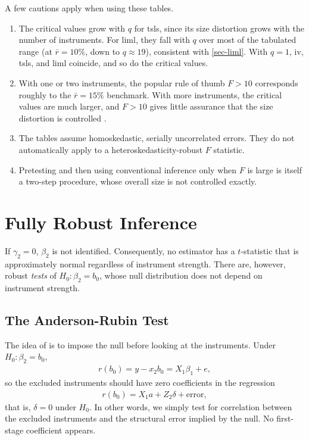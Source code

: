 \documentclass[a4paper,12pt]{article}
\begin{document}
\begin{remark}[Caveats]
	A few cautions apply when using these tables.
	\begin{enumerate}
		\item The critical values grow with $q$ for \gls{tsls}, since its size distortion grows with the number of instruments.
		For \gls{liml}, they fall with $q$ over most of the tabulated range (at $\bar r=10\%$, down to $q\approx19$),
		consistent with \autoref{sec-liml}.
		With $q=1$, \gls{iv}, \gls{tsls}, and \gls{liml} coincide, and so do the critical values.
		\item With one or two instruments, the popular rule of thumb $F>10$ \parencite{staiger-stock-1997}
		corresponds roughly to the $\bar r=15\%$ benchmark.
		With more instruments, the critical values are much larger, and $F>10$ gives little assurance that the size distortion is controlled \parencite{stock-yogo-2005}.
		\item The tables assume homoskedastic, serially uncorrelated errors.
		They do not automatically apply to a heteroskedasticity-robust $F$ statistic.
		\item Pretesting and then using conventional inference only when $F$ is large is itself a two-step procedure,
		whose overall size is not controlled exactly.
	\end{enumerate}
\end{remark}

\section{Fully Robust Inference}\label{sec-ar}

If $\gamma_2=0$, $\beta_2$ is not identified.
Consequently, no estimator has a $t$-statistic that is approximately normal regardless of instrument strength.
There are, however, robust \emph{tests} of $H_0:\beta_2=b_0$,
whose null distribution does not depend on instrument strength.

\subsection{The Anderson-Rubin Test}

The idea of \textcite{anderson-rubin-1949} is to impose the null before looking at the instruments.
Under $H_0:\beta_2=b_0$,
\begin{align}
	r(b_0)=y-x_2b_0=X_1\beta_1+e,
\end{align}
so the excluded instruments should have zero coefficients in the regression
\begin{align}\label{eq-ar-regression}
	r(b_0)=X_1a+Z_2\delta+\text{error},
\end{align}
that is, $\delta=0$ under $H_0$.
In other words, we simply test for correlation between the excluded instruments and the structural error implied by the null.
No first-stage coefficient appears.
\end{document}
